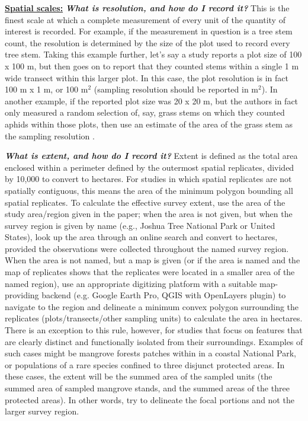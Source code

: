 \documentclass[12pt]{article}
\begin{document}
\begin{enumerate}
\hspace{-1cm}\underline{\textbf{Spatial scales:}}
  \Hitem \emph{\textbf{What is resolution, and how do I record it?}} This is the finest scale at which a complete measurement of every unit of the quantity of interest is recorded.  For example, if the measurement in question is a tree stem count, the resolution is determined by the size of the plot used to record every tree stem. Taking this example further, let's say a study reports a plot size of 100 x 100 m, but then goes on to report that they counted stems within a single 1 m wide transect within this larger plot.  In this case, the plot resolution is in fact 100 m x 1 m, or 100 m$^2$ (sampling resolution should be reported in m$^2$).  In another example, if the reported plot size was 20 x 20 m, but the authors in fact only measured a random selection of, say, grass stems on which they counted aphids within those plots, then use an estimate of the area of the grass stem as the sampling resolution \cite{gagic_agricultural_2012}.  
 
  \Hitem \emph{\textbf{What is extent, and how do I record it?}} Extent is defined as the total area enclosed within a perimeter defined by the outermost spatial replicates, divided by 10,000 to convert to hectares. For studies in which spatial replicates are not spatially contiguous, this means the area of the minimum polygon bounding all spatial replicates. To calculate the effective survey extent, use the area of the study area/region given in the paper; when the area is not given, but when the survey region is given by name (e.g., Joshua Tree National Park or United States), look up the area through an online search and convert to hectares, provided the observations were collected throughout the named survey region. When the area is not named, but a map is given (or if the area is named and the map of replicates shows that the replicates were located in a smaller area of the named region), use an appropriate digitizing platform with a suitable map-providing backend (e.g. Google Earth Pro, QGIS with OpenLayers plugin) to navigate to the region and delineate a minimum convex polygon surrounding the replicates (plots/transects/other sampling units) to calculate the area in hectares. There is an exception to this rule, however, for studies that focus on features that are clearly distinct and functionally isolated from their surroundings. Examples of such cases might be mangrove forests patches within in a coastal National Park, or populations of a rare species confined to three disjunct protected areas. In these cases, the extent will be the summed area of the sampled units (the summed area of sampled mangrove stands, and the summed areas of the three protected areas). In other words, try to delineate the focal portions and not the larger survey region.
  

\end{enumerate}
\end{document}
